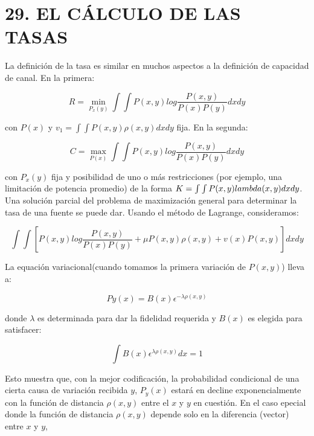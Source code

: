 \section{29. EL C\'ALCULO DE LAS TASAS}

La definici\'on de la tasa es similar en muchos aspectos a la definici\'on de capacidad de canal. 
En la primera:
	
\begin{equation} R = \min_{P_{x}(y)} \int \int  P(x,y) log \frac{P(x,y)}{P(x)P(y)} dx dy \end{equation}
			
con $P(x)$ y $v_{1} = \int \int P(x,y) \rho(x,y) dx dy $ fija. En la segunda:

\begin{equation} C = \max_{P(x)} \int \int P(x,y) log  \frac{P(x,y)}{P(x)P(y)} dx dy \end{equation}
			
con $P_{x}(y)$ fija y posibilidad de uno o m\'as restricciones (por ejemplo, una limitaci\'on
de potencia promedio) de la forma $K = \int \int P(x,y) \\lambda(x,y) dx dy$.
Una soluci\'on parcial del problema de maximizaci\'on general para determinar la tasa
de una fuente se puede dar. 
Usando el m\'etodo de Lagrange, consideramos:

\begin{equation} \int \int [ P(x,y) log \frac{P(x,y)}{P(x)P(y)} + \mu P(x,y)\rho(x,y) + v(x)P(x,y)] dx dy \end{equation}

La equaci\'on variacional(cuando tomamos la primera variaci\'on de $P(x,y)$) lleva a:

\begin{equation} Py(x) = B(x)\epsilon^{-\lambda \rho(x,y)} \end{equation}
			
donde $\lambda$ es determinada para dar la fidelidad requerida y $B(x)$ es elegida para
satisfacer:

\begin{equation} \int B(x) \epsilon^{\lambda \rho(x,y)} dx  = 1 \end{equation}
			
Esto muestra que, con la mejor codificaci\'on, la probabilidad condicional de una cierta
causa de variaci\'on recibida $y$, $P_{y}(x)$ estar\'a en decline exponencialmente con
la funci\'on de distancia $\rho(x,y)$ entre el $x$ y $y$ en cuesti\'on. 
En el caso epecial donde la funci\'on de distancia $\rho(x,y)$ depende solo en la diferencia
(vector) entre $x$ y $y$,

